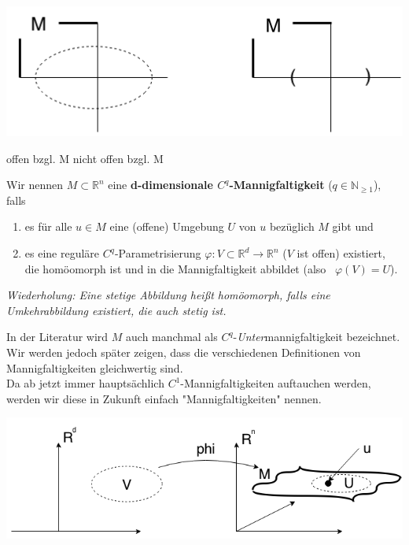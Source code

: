 \begin{center}
\includegraphics[scale=0.5]{pictures/001-07}\\
\end{center}
\hspace{70pt} offen bzgl. M \hspace{70pt} nicht offen bzgl. M\\

\begin{definition}[Mannigfaltigkeiten]
Wir nennen $M\subset\mathbb{R}^n$ eine \textbf{d-dimensionale $C^q$-Mannigfaltigkeit} ($q\in\mathbb{N}_{\geq 1}$), falls

\begin{enumerate}
\item es für alle $u\in M$ eine (offene) Umgebung $U$ von $u$ bezüglich $M$ gibt und
\item es eine reguläre $C^q$-Parametrisierung $\varphi:V\subset\mathbb{R}^d\rightarrow\mathbb{R}^n$ ($V$ ist offen) existiert, die homöomorph ist und in die Mannigfaltigkeit abbildet (also \  $\varphi(V)=U$).
\end{enumerate}

\emph{Wiederholung: Eine stetige Abbildung heißt homöomorph, falls eine Umkehrabbildung existiert, die auch stetig ist.}\\
\end{definition}

In der Literatur wird $M$ auch manchmal als $C^q$-\emph{Unter}mannigfaltigkeit bezeichnet. Wir werden jedoch später zeigen, dass die verschiedenen Definitionen von Mannigfaltigkeiten gleichwertig sind.\\
Da ab jetzt immer hauptsächlich $C^1$-Mannigfaltigkeiten auftauchen werden, werden wir diese in Zukunft einfach "Mannigfaltigkeiten" nennen.\\

\begin{center}
\includegraphics[scale=0.5]{pictures/001-08}\\
\end{center}

